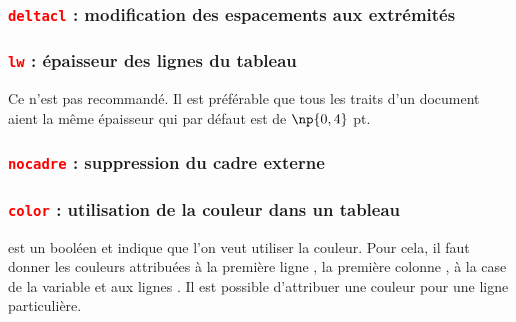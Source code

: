 \subsubsection{\texttt{\textcolor{red}{deltacl}} : modification des espacements aux extrémités}

\begin{tkzexample}[width=9cm,small]
\end{tkzexample}  

\subsubsection{\texttt{\textcolor{red}{lw}} : épaisseur des lignes du tableau}
Ce n'est pas recommandé. Il est préférable que tous les traits d'un document aient la même épaisseur qui par défaut est de $\np{0,4}$ pt.

\begin{tkzexample}[width=8cm,small]
\end{tkzexample}  

\subsubsection{\texttt{\textcolor{red}{nocadre}} : suppression du cadre externe}

\begin{tkzexample}[width=8cm,small]
\end{tkzexample}  

\subsubsection{\texttt{\textcolor{red}{color}} : utilisation de la couleur dans un tableau}
 est un booléen et indique que l'on veut utiliser la couleur. Pour cela, il faut donner les couleurs attribuées à la première ligne , la première colonne , à la case de la variable  et aux lignes . Il est possible d'attribuer une couleur  pour une ligne particulière.

